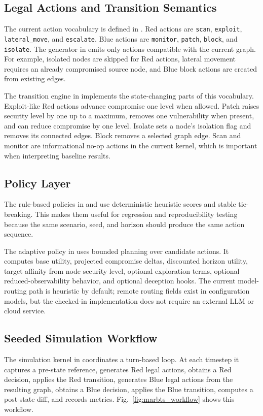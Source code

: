 \documentclass[conference]{IEEEtran}
\begin{document}
\subsection{Legal Actions and Transition Semantics}
The current action vocabulary is defined in . Red actions are \texttt{scan}, \texttt{exploit}, \texttt{lateral\_move}, and \texttt{escalate}. Blue actions are \texttt{monitor}, \texttt{patch}, \texttt{block}, and \texttt{isolate}. The generator in  emits only actions compatible with the current graph. For example, isolated nodes are skipped for Red actions, lateral movement requires an already compromised source node, and Blue block actions are created from existing edges.

The transition engine in  implements the state-changing parts of this vocabulary. Exploit-like Red actions advance compromise one level when allowed. Patch raises security level by one up to a maximum, removes one vulnerability when present, and can reduce compromise by one level. Isolate sets a node's isolation flag and removes its connected edges. Block removes a selected graph edge. Scan and monitor are informational no-op actions in the current kernel, which is important when interpreting baseline results.

\subsection{Policy Layer}
The rule-based policies in  and  use deterministic heuristic scores and stable tie-breaking. This makes them useful for regression and reproducibility testing because the same scenario, seed, and horizon should produce the same action sequence.

The adaptive policy in  uses bounded planning over candidate actions. It computes base utility, projected compromise deltas, discounted horizon utility, target affinity from node security level, optional exploration terms, optional reduced-observability behavior, and optional deception hooks. The current model-routing path is heuristic by default; remote routing fields exist in configuration models, but the checked-in implementation does not require an external LLM or cloud service.

\subsection{Seeded Simulation Workflow}
The simulation kernel in  coordinates a turn-based loop. At each timestep it captures a pre-state reference, generates Red legal actions, obtains a Red decision, applies the Red transition, generates Blue legal actions from the resulting graph, obtains a Blue decision, applies the Blue transition, computes a post-state diff, and records metrics. Fig.~\ref{fig:marbts_workflow} shows this workflow.
\end{document}
